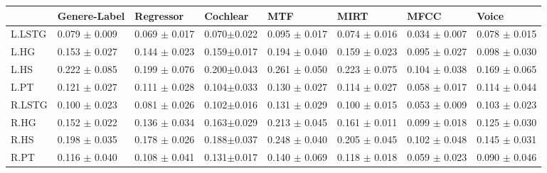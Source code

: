 \begin{tabular}{llllllll} 
	\toprule
	 &    	    Genere-Label &		  Regressor &   		 Cochlear &  		  MTF &   	 			MIRT & 			  		MFCC &    				Voice 			    \\
	\midrule
	L.LSTG &  	0.079 $\pm$ 0.009 &   0.069 $\pm$ 0.017 &    0.070$\pm$0.022 &    0.095 $\pm$ 0.017 &   0.074 $ \pm $ 0.016 &   0.034 $ \pm $ 0.007 &	 0.078 $ \pm $ 0.015 \\
	L.HG &  	0.153 $\pm$ 0.027 &   0.144 $\pm$ 0.023 &    0.159$\pm$0.017 &    0.194 $\pm$ 0.040 &   0.159 $ \pm $ 0.023 &   0.095 $ \pm $ 0.027 &	 0.098 $ \pm $ 0.030 \\
	L.HS &  	0.222 $\pm$ 0.085 &   0.199 $\pm$ 0.076 &    0.200$\pm$0.043 &    0.261 $\pm$ 0.050 &   0.223 $ \pm $ 0.075 &   0.104 $ \pm $ 0.038 &	 0.169 $ \pm $ 0.065 \\
	L.PT &  	0.121 $\pm$ 0.027 &   0.111 $\pm$ 0.028 &    0.104$\pm$0.033 &    0.130 $\pm$ 0.027 &   0.114 $ \pm $ 0.027 &   0.058 $ \pm $ 0.017 &	 0.114 $ \pm $ 0.044 \\
	R.LSTG &  	0.100 $\pm$ 0.023 &   0.081 $\pm$ 0.026 &    0.102$\pm$0.016 &    0.131 $\pm$ 0.029 &   0.100 $ \pm $ 0.015 &   0.053 $ \pm $ 0.009 &	 0.103 $ \pm $ 0.023 \\
	R.HG &  	0.152 $\pm$ 0.022 &   0.136 $\pm$ 0.034 &    0.163$\pm$0.029 &    0.213 $\pm$ 0.045 &   0.161 $ \pm $ 0.011 &   0.099 $ \pm $ 0.018 &	 0.125 $ \pm $ 0.030 \\
	R.HS &  	0.198 $\pm$ 0.035 &   0.178 $\pm$ 0.026 &    0.188$\pm$0.037 &    0.248 $\pm$ 0.040 &   0.205 $ \pm $ 0.045 &   0.102 $ \pm $ 0.048 &	 0.145 $ \pm $ 0.031 \\
	R.PT &  	0.116 $\pm$ 0.040 &   0.108 $\pm$ 0.041 &    0.131$\pm$0.017 &    0.140 $\pm$ 0.069 &   0.118 $ \pm $ 0.018 &   0.059 $ \pm $ 0.023 &	 0.090 $ \pm $ 0.046 \\
	\bottomrule
\end{tabular}
